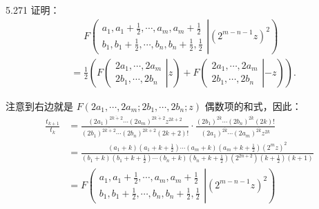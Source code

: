 \begin{problem}{5.27}{1}
  证明：
  \begin{align*}
    &\phantom{=} F
    \left( \left.
      \begin{array}{cccc}
        a_1, a_1 + \frac{1}{2}, \cdots, a_m, a_m + \frac{1}{2} \\
        b_1, b_1 + \frac{1}{2}, \cdots, b_n, b_n + \frac{1}{2}, \frac{1}{2}
    \end{array} \right|{(2^{m-n-1} z)^2} \right) \\
    &=
    \frac{1}{2} \left(
      F
      \left( \left.
        \begin{array}{cccc}
          2a_1, \cdots, 2a_m \\
          2b_1, \cdots, 2b_n
      \end{array} \right|{z} \right)
      +
      F
      \left( \left.
        \begin{array}{cccc}
          2a_1, \cdots, 2a_m \\
          2b_1, \cdots, 2b_n
    \end{array} \right|{-z} \right) \right).
  \end{align*}
\end{problem}

注意到右边就是 \( F(2a_1,\cdots,2a_m; 2b_1,\cdots,2b_n; z) \) 偶数项的和式，因此：
\begin{align*}
  \frac{t_{k+1}}{t_k} &= \frac{(2a_1)^{\overline{2k+2}} \cdots (2a_m)^{\overline{2k+2}} z^{2k+2}}{(2b_1)^{\overline{2k+2}} \cdots (2b_n)^{\overline{2k+2}} (2k+2)!} \cdot \frac{(2b_1)^{\overline{2k}} \cdots (2b_n)^{\overline{2k}} (2k)!}{(2a_1)^{\overline{2k}} \cdots (2a_m)^{\overline{2k}} z^{2k}} \\
  &= \frac{(a_1+k)(a_1+k+\frac{1}{2}) \cdots (a_m+k)(a_m+k+\frac{1}{2}) (2^m z)^2}{(b_1+k)(b_1+k+\frac{1}{2}) \cdots (b_n+k)(b_n+k+\frac{1}{2}) (2^{2n+2}) (k+\frac{1}{2})(k+1)} \\
  &= F
  \left( \left.
    \begin{array}{cccc}
      a_1, a_1 + \frac{1}{2}, \cdots, a_m, a_m + \frac{1}{2} \\
      b_1, b_1 + \frac{1}{2}, \cdots, b_n, b_n + \frac{1}{2}, \frac{1}{2}
  \end{array} \right|{(2^{m-n-1} z)^2} \right)
\end{align*}

